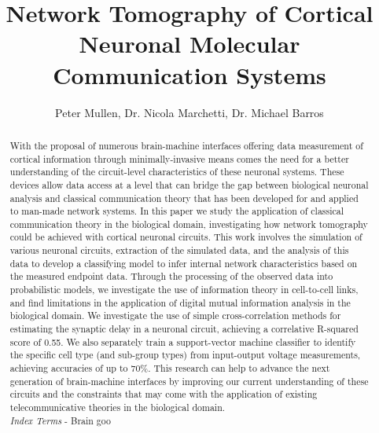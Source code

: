 \documentclass[letterpaper, 10 pt, conference]{ieeeconf}  %
\title{\Huge 
Network Tomography of Cortical Neuronal Molecular Communication Systems
}
\author{Peter Mullen, Dr. Nicola Marchetti, Dr. Michael Barros}
\begin{document}
\maketitle
\thispagestyle{empty}
\pagestyle{plain} 

\begin{abstract}
With the proposal of numerous brain-machine interfaces offering data measurement
of cortical information through minimally-invasive means comes the need for a better
understanding of the circuit-level characteristics of these neuronal systems. These
devices allow data access at a level that can bridge the gap between biological
neuronal analysis and classical communication theory that has been developed for
and applied to man-made network systems. 
In this paper we study the application of classical communication theory in the
biological domain, investigating how network tomography could be
achieved with cortical neuronal circuits. This work involves the simulation of
various neuronal circuits, extraction of the simulated data, and the analysis of this data to develop a
classifying model to infer internal network characteristics based on the measured
endpoint data. Through the processing of the observed data into probabilistic models, we investigate
the use of information theory in cell-to-cell links, and find limitations in the application of
digital mutual information analysis in the biological domain. We investigate the use of simple cross-correlation methods for estimating the synaptic delay in a neuronal circuit, achieving a correlative R-squared score of 0.55.
We also separately train a support-vector machine classifier to identify
the specific cell type (and sub-group types) from input-output voltage measurements, achieving accuracies of up to 70\%.
This research can help to advance the next generation of brain-machine interfaces by improving our current understanding of these circuits and the constraints that may come with the application of existing telecommunicative theories in the biological domain.\\
\textit{Index Terms} - Brain goo
\end{abstract}
\end{document}
